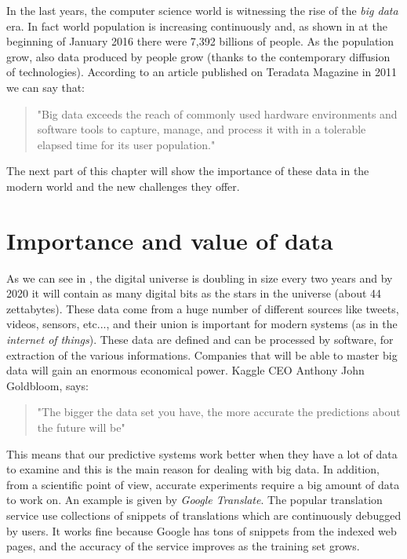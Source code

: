 In the last years, the computer science world is witnessing the rise of the \textit{big data} era. In fact world population is  increasing continuously and, as shown in \cite{World} at the beginning of January 2016 there were 7,392 billions of people. As the population grow, also data produced by people grow (thanks to the contemporary diffusion of technologies).
According to an article published on Teradata Magazine in 2011 we can say that:
\begin{quote}
"Big data exceeds the reach of commonly used hardware environments and software tools to capture, manage, and process it with in a tolerable elapsed time for its user population."
\end{quote}
The next part of this chapter will show the importance of these data in the modern world and the new challenges they offer.

\section{Importance and value of data}\label{sec12:DataValues}
As we can see in \cite{EMC1}, the digital universe is doubling in size every two years and by 2020 it will contain as many digital bits as the stars in the universe (about 44 zettabytes). These data come from a huge number of different sources like tweets, videos, sensors, etc..., and their union is important for modern systems (as in the \textit{internet of things}).
These data are defined and can be processed by software, for extraction of the various informations. Companies that will be able to master big data will gain an enormous economical power. Kaggle CEO Anthony John Goldbloom, says: 
\begin{quotation}
"The bigger the data set you have, the more accurate the predictions about the future will be"
\end{quotation}
This means that our predictive systems work better when they have a lot of data to examine and this is the main reason for dealing with big data. In addition, from a scientific point of view, accurate experiments require a big amount of data to work on. An example is given by \textit{Google Translate}. The popular translation service use collections of snippets of translations which are continuously debugged by users. It works fine because Google has tons of snippets from the indexed web pages, and the accuracy of the service improves as the training set grows.\\

